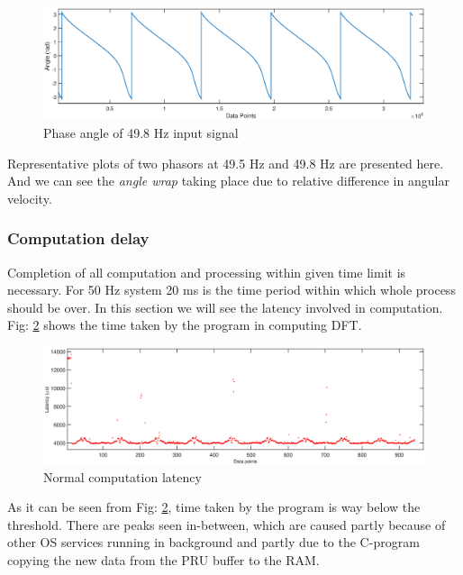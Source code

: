 \begin{figure}[h]
	\includegraphics[width=\textwidth]{fig/498Hz_ang.eps}
	\caption{Phase angle of 49.8 Hz input signal}
	\label{fig:49.8Hz ang}
\end{figure}
 
Representative plots of two phasors at 49.5 Hz and 49.8 Hz are presented here. And we can see the \textit{angle wrap} taking place due to relative difference in angular velocity.

\subsubsection{Computation delay}
Completion of all computation and processing within given time limit is necessary. For 50 Hz system 20 ms is the time period within which whole process should be over. In this section we will see the latency involved in computation. Fig: \ref{fig:simpleLatency} shows the time taken by the program in computing DFT.

\begin{figure}[h]
	\includegraphics[width=\textwidth]{fig/simple_latency.eps}
	\caption{Normal computation latency}
	\label{fig:simpleLatency}
\end{figure}

As it can be seen from Fig: \ref{fig:simpleLatency}, time taken by the program is way below the threshold. There are peaks seen in-between, which are caused partly because of other OS services running in background and partly due to the C-program copying the new data from the PRU buffer to the RAM.   


